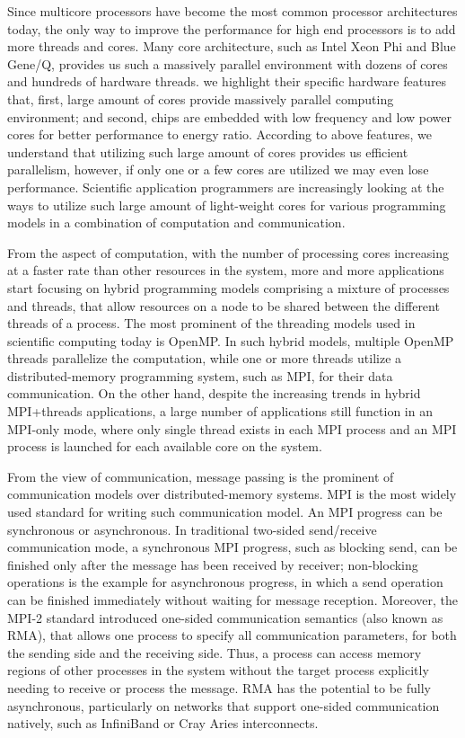 Since multicore processors have become the most common processor architectures today, the only way to 
improve the performance for high end processors is to add more threads 
and cores. Many core architecture, such as Intel Xeon Phi and Blue Gene/Q, 
provides us such a massively parallel environment with dozens of cores and
hundreds of hardware threads. we highlight their specific hardware features 
that, first, large amount of cores provide massively parallel computing 
environment; and second, chips are embedded with low frequency and low power
cores for better performance to energy ratio. 
According to above features, we understand that utilizing such large amount 
of cores provides us efficient parallelism, 
however, if only one or a few cores are utilized we may even lose performance. 
Scientific application programmers are increasingly looking at the ways to 
utilize such large amount of light-weight cores for various programming 
models in a combination of computation and communication. 

From the aspect of computation, with the number of processing cores increasing at 
a faster rate than other resources in the system, more and more applications 
start focusing on hybrid programming models comprising a mixture of processes 
and threads, that allow resources on a node to be shared between the different 
threads of a process. The most prominent of the 
threading models used in scientific computing today is OpenMP. In such hybrid models, 
multiple OpenMP threads parallelize the computation, while one or more threads 
utilize a distributed-memory programming system, such as MPI, for their data 
communication. On the other hand, despite the increasing trends in hybrid MPI+threads
applications, a large number of applications still function in an MPI-only 
mode, where only single thread exists in each MPI process and an MPI process 
is launched for each available core on the system.

From the view of communication, message passing is the prominent of communication
models over distributed-memory systems. MPI is the most widely used standard for 
writing such communication model. An MPI progress can be synchronous or asynchronous. 
In traditional two-sided send\slash receive communication mode, a synchronous MPI progress, such as 
blocking send, can be finished only after the message has been received by receiver;
non-blocking operations is the example for asynchronous progress, in which a send 
operation can be finished immediately without waiting for message reception. 
Moreover, the MPI-2 standard introduced one-sided communication semantics (also known as RMA), 
that allows one process to specify all communication parameters, for both the 
sending side and the receiving side. Thus, a process can access memory regions 
of other processes in the system without the target process explicitly needing 
to receive or process the message. RMA has the potential to be fully asynchronous, 
particularly on networks that support one-sided communication natively, 
such as InfiniBand or Cray Aries interconnects.

